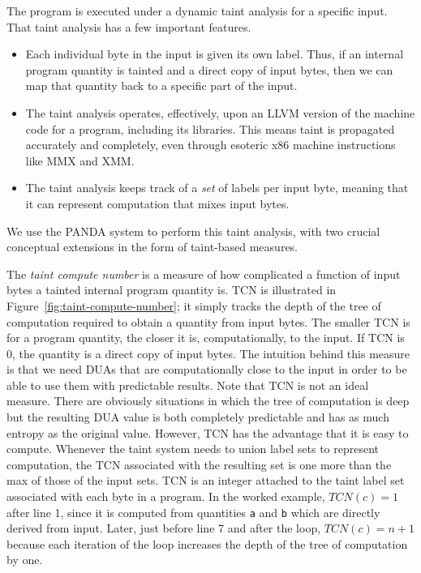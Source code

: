 The program is executed under a dynamic taint analysis for a specific input.
That taint analysis has a few important features.
\begin{itemize}
\item Each individual byte in the input is given its own label.
Thus, if an internal program quantity is tainted and a direct copy of input bytes, then we can map that quantity back to a specific part of the input.  
\item The taint analysis operates, effectively, upon an LLVM version of the machine code for a program, including its libraries.
This means taint is propagated accurately and completely, even through esoteric x86 machine instructions like MMX and XMM.
\item The taint analysis keeps track of a \emph{set} of labels per input byte, meaning that it can represent computation that mixes input bytes.
\end{itemize}
We use the PANDA system to perform this taint analysis, with two crucial conceptual extensions in the form of taint-based measures.

The \emph{taint compute number} is a measure of how complicated a function of input bytes a tainted internal program quantity is.
TCN is illustrated in Figure~\ref{fig:taint-compute-number}; it simply tracks the depth of the tree of computation required to obtain 
a quantity from input bytes.
The smaller TCN is for a program quantity, the closer it is, computationally, to the input.
If TCN is 0, the quantity is a direct copy of input bytes.
The intuition behind this measure is that we need DUAs that are computationally close to the input in order to be able to use them with predictable results.
Note that TCN is not an ideal measure.
There are obviously situations in which the tree of computation is deep but the resulting DUA value is both completely predictable and has as much entropy as the original value.
However, TCN has the advantage that it is easy to compute.
Whenever the taint system needs to union label sets to represent computation, the TCN associated with the resulting set is one more than the max of those of the 
input sets.
TCN is an integer attached to the taint label set associated with each byte in a program.
In the worked example, $TCN(c)=1$ after line 1, since it is computed from quantities \verb+a+ and \verb+b+ which are directly derived from input.
Later, just before line 7 and after the loop, $TCN(c)=n+1$ because each iteration of the loop increases the depth of the tree of computation by one.  

